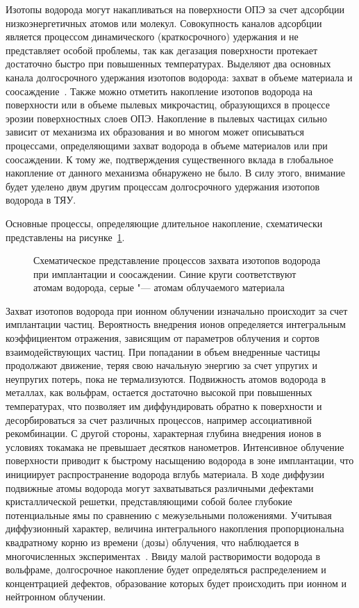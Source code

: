 Изотопы водорода могут накапливаться на поверхности ОПЭ за счет адсорбции низкоэнергетичных атомов или молекул. Совокупность каналов адсорбции является процессом динамического (краткосрочного) удержания и не представляет особой проблемы, так как дегазация поверхности протекает достаточно быстро при повышенных температурах. Выделяют два основных канала долгосрочного удержания изотопов водорода: захват в объеме материала и соосаждение~\cite{Gasparyan2024, Skinner2009}. Также можно отметить накопление изотопов водорода на поверхности или в объеме пылевых микрочастиц, образующихся в процессе эрозии поверхностных слоев ОПЭ. Накопление в пылевых частицах сильно зависит от механизма их образования и во многом может описываться процессами, определяющими захват водорода в объеме материалов или при соосаждении. К тому же, подтверждения существенного вклада в глобальное накопление от данного механизма обнаружено не было. В силу этого, внимание будет уделено двум другим процессам долгосрочного удержания изотопов водорода в ТЯУ.

Основные процессы, определяющие длительное накопление, схематически представлены на рисунке~\cref{fig:ch1/retention_mechanisms}.
\begin{figure}[ht]
    \caption{Схематическое представление процессов захвата изотопов водорода при имплантации и соосаждении. Синие круги соответствуют атомам водорода, серые "--- атомам облучаемого материала}\label{fig:ch1/retention_mechanisms}
\end{figure}
Захват изотопов водорода при ионном облучении изначально происходит за счет имплантации частиц. Вероятность внедрения ионов определяется интегральным коэффициентом отражения, зависящим от параметров облучения и сортов взаимодействующих частиц. При попадании в объем внедренные частицы продолжают движение, теряя свою начальную энергию за счет упругих и неупругих потерь, пока не термализуются. Подвижность атомов водорода в металлах, как вольфрам, остается достаточно высокой при повышенных температурах, что позволяет им диффундировать обратно к поверхности и десорбироваться за счет различных процессов, например ассоциативной рекомбинации. С другой стороны, характерная глубина внедрения ионов в условиях токамака не превышает десятков нанометров. Интенсивное облучение поверхности приводит к быстрому насыщению водорода в зоне имплантации, что инициирует распространение водорода вглубь материала. В ходе диффузии подвижные атомы водорода могут захватываться различными дефектами кристаллической решетки, представляющими собой более глубокие потенциальные ямы по сравнению с межузельными положениями. Учитывая диффузионный характер, величина интегрального накопления пропорциональна квадратному корню из времени (дозы) облучения, что наблюдается в многочисленных экспериментах~\cite{Ogorodnikova2003,Ogorodnikova2009,Sugiyama2014,Zhang2020}. Ввиду малой растворимости водорода в вольфраме, долгосрочное накопление будет определяться распределением и концентрацией дефектов, образование которых будет происходить при ионном и нейтронном облучении.

